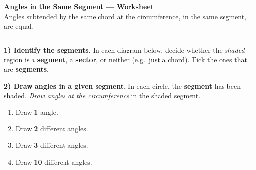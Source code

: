 \documentclass[11pt,a4paper]{article}
\newcommand{\Title}{Angles in the Same Segment — Worksheet}
\def\Rmini{1.6}
\newcommand{\coordOnCircle}[3]{%
  \coordinate (#1) at ({#2*cos(#3)},{#2*sin(#3)});
}
\newcommand{\SegmentShaded}[9]{%
  \begin{scope}[shift={(#1,#2)}]
    \draw[circleline, opacity=0.7] (0,0) circle (#3);
    \coordOnCircle{A}{#3}{#4}
    \coordOnCircle{B}{#3}{#5}
    \fill[#9] (A) arc[start angle=#4, end angle=#5, radius=#3] -- (B) -- cycle;
    \ifnum#7>0
      \draw[circleline] (0,0) circle (#3);
    \fi
    \ifnum#6>0
      \draw[chord] (A)--(B);
    \fi
    \ifnum#8>0
      \node[labelAB, below right=1pt of A] {\(A\)};
      \node[labelAB, below left=1pt of B] {\(B\)};
      \fill (A) circle (1pt);
      \fill (B) circle (1pt);
    \fi
  \end{scope}
}
\newcommand{\SectorShaded}[9]{%
  \begin{scope}[shift={(#1,#2)}]
    \draw[circleline, opacity=0.7] (0,0) circle (#3);
    \coordOnCircle{A}{#3}{#4}
    \coordOnCircle{B}{#3}{#5}
    \fill[#9] (0,0) -- (A) arc[start angle=#4, end angle=#5, radius=#3] -- cycle;
    \ifnum#7>0
      \draw[circleline] (0,0) circle (#3);
    \fi
    \ifnum#6>0
      \draw[chord] (0,0)--(A);
      \draw[chord] (0,0)--(B);
    \fi
    \ifnum#8>0
      \node[labelAB, below right=1pt of A] {\(A\)};
      \node[labelAB, below left=1pt of B] {\(B\)};
      \fill (A) circle (1pt);
      \fill (B) circle (1pt);
    \fi
  \end{scope}
}
\newcommand{\ChordOnly}[6]{%
  \begin{scope}[shift={(#1,#2)}]
    \draw[circleline] (0,0) circle (#3);
    \coordOnCircle{A}{#3}{#4}
    \coordOnCircle{B}{#3}{#5}
    \draw[chord] (A)--(B);
    \ifnum#6>0
      \node[labelAB, below right=1pt of A] {\(A\)};
      \node[labelAB, below left=1pt of B] {\(B\)};
      \fill (A) circle (1pt);
      \fill (B) circle (1pt);
    \fi
  \end{scope}
}
\begin{document}
\begin{center}
  {\LARGE \bfseries \Title}\\[0.25em]
  \small Angles subtended by the same chord at the circumference, in the same segment, are equal.
\end{center}

\hrule
\vspace{2em}

\textbf{1) Identify the segments.}  
In each diagram below, decide whether the \emph{shaded} region is a \textbf{segment}, a \textbf{sector}, or neither (e.g.\ just a chord).  
Tick the ones that are \textbf{segments}. 

\vspace{0.6em}
\begin{center}
\end{center}

\newpage{}

\textbf{2) Draw angles in a given segment.}  
In each circle, the \textbf{segment} has been shaded.  
\emph{Draw angles at the circumference} in the shaded segment.
\begin{enumerate}[label=(\alph*)]
  \item Draw \textbf{1} angle.
  \item Draw \textbf{2} different angles.
  \item Draw \textbf{3} different angles.
  \item Draw \textbf{10} different angles.
\end{enumerate}
\end{document}

